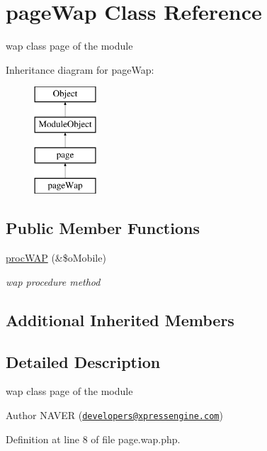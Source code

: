 \hypertarget{classpageWap}{}\section{page\+Wap Class Reference}
\label{classpageWap}


wap class page of the module  


Inheritance diagram for page\+Wap\+:\begin{figure}[H]
\begin{center}
\leavevmode
\includegraphics[height=4.000000cm]{classpageWap}
\end{center}
\end{figure}
\subsection*{Public Member Functions}
\begin{DoxyCompactItemize}
\item 
\hyperlink{classpageWap_a7ee56942979074bd2b79621dfc7349e9}{proc\+W\+AP} (\&\$o\+Mobile)
\begin{DoxyCompactList}\small\item\em wap procedure method \end{DoxyCompactList}\end{DoxyCompactItemize}
\subsection*{Additional Inherited Members}


\subsection{Detailed Description}
wap class page of the module 

\begin{DoxyAuthor}{Author}
N\+A\+V\+ER (\href{mailto:developers@xpressengine.com}{\tt developers@xpressengine.\+com}) 
\end{DoxyAuthor}


Definition at line 8 of file page.\+wap.\+php.



